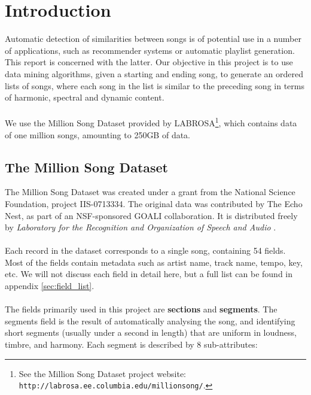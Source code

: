 
\section{Introduction} %
\label{sec:introduction}
Automatic detection of similarities between songs is of potential use in a number of applications, such as recommender systems or automatic playlist generation. This report is concerned with the latter. Our objective in this project is to use data mining algorithms, given a starting and ending song, to generate an ordered lists of songs, where each song in the list is similar to the preceding song in terms of harmonic, spectral and dynamic content.
\\\\
We use the Million Song Dataset provided by LABROSA\footnote{See the Million Song Dataset project website: \texttt{http://labrosa.ee.columbia.edu/millionsong/}.}, which contains data of one million songs, amounting to 250GB of data.
\subsection{The Million Song Dataset} %
\label{sub:the_million_song_dataset}
The Million Song Dataset was created under a grant from the National Science Foundation, project IIS-0713334. The original data was contributed by The Echo Nest, as part of an NSF-sponsored GOALI collaboration. It is distributed freely by \textit{Laboratory for the Recognition and Organization of Speech and Audio} \citep{bert11}.
\\\\
Each record in the dataset corresponds to a single song, containing 54 fields. Most of the fields contain metadata such as artist name, track name, tempo, key, etc. We will not discuss each field in detail here, but a full list can be found in appendix \ref{sec:field_list}.
\\\\
The fields primarily used in this project are \textbf{sections} and \textbf{segments}. The segments field is the result of automatically analysing the song, and identifying short segments (usually under a second in length) that are uniform in loudness, timbre, and harmony. Each segment is described by 8 sub-attributes:

